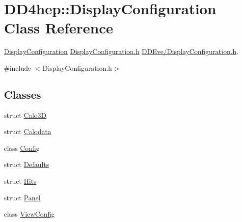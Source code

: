 \hypertarget{class_d_d4hep_1_1_display_configuration}{
\section{DD4hep::DisplayConfiguration Class Reference}
\label{class_d_d4hep_1_1_display_configuration}
}


\hyperlink{class_d_d4hep_1_1_display_configuration}{DisplayConfiguration} \hyperlink{_display_configuration_8h}{DisplayConfiguration.h} \hyperlink{_display_configuration_8h}{DDEve/DisplayConfiguration.h}.  


{\ttfamily \#include $<$DisplayConfiguration.h$>$}\subsection*{Classes}
\begin{DoxyCompactItemize}
\item 
struct \hyperlink{struct_d_d4hep_1_1_display_configuration_1_1_calo3_d}{Calo3D}
\item 
struct \hyperlink{struct_d_d4hep_1_1_display_configuration_1_1_calodata}{Calodata}
\item 
class \hyperlink{class_d_d4hep_1_1_display_configuration_1_1_config}{Config}
\item 
struct \hyperlink{struct_d_d4hep_1_1_display_configuration_1_1_defaults}{Defaults}
\item 
struct \hyperlink{struct_d_d4hep_1_1_display_configuration_1_1_hits}{Hits}
\item 
struct \hyperlink{struct_d_d4hep_1_1_display_configuration_1_1_panel}{Panel}
\item 
class \hyperlink{class_d_d4hep_1_1_display_configuration_1_1_view_config}{ViewConfig}
\end{DoxyCompactItemize}
